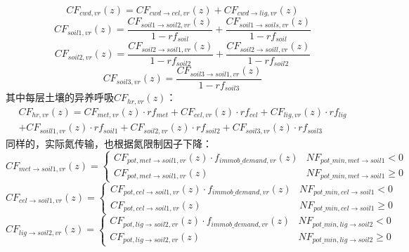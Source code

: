 \begin{equation}
C F_{c w d, vr}(z)=C F_{c w d \rightarrow cel, vr}(z)+C F_{c w d \rightarrow lig, vr}(z)
\end{equation}
\begin{equation}
C F_{{soil } 1, vr}(z)=\frac{C F_{{soil1 } \rightarrow { soil } 2, vr}(z)}{1-r f_{{soil }}}+\frac{C F_{{soil } 1 \rightarrow { soils,vr }}(z)}{1-r f_{{soil }}}
\end{equation}
\begin{equation}
C F_{{soil2,vr }}(z)=\frac{C F_{{soil2 } \rightarrow { soil1,vr }}(z)}{1-r f_{{soil2 }}}+\frac{C F_{{soil2 } \rightarrow { soill,vr }}(z)}{1-r f_{{soil2 }}}
\end{equation}
\begin{equation}
C F_{{soil3,vr }}(z)=\frac{C F_{{soil } 3 \rightarrow { soil1,vr}}(z)}{1-r f_{{soil3 }}}
\end{equation}
其中每层土壤的异养呼吸$CF_{hr,vr}\left(z\right)$：
\begin{equation}
\begin{array}{l}C F_{h r, vr}(z)=C F_{met, vr}(z) \cdot r f_{met}+C F_{cel, vr}(z) \cdot r f_{cel}+C F_{lig, vr}(z) \cdot r f_{lig} \\ +C F_{{soill } 1, vr}(z) \cdot r f_{{soil1 }}+C F_{{soil2,vr }}(z) \cdot r f_{{soil2 }}+C F_{{soil3,vr }}(z) \cdot r f_{{soil3 }}\end{array}
\end{equation}
同样的，实际氮传输，也根据氮限制因子下降：
\begin{equation}
    CF_{met \rightarrow soil1, vr}(z)=\left\{\begin{array}{ll} CF_{pot, met \rightarrow soil1, vr}(z) \cdot f_{immob\_demand, vr}(z) & NF_{pot\_{min, met \rightarrow soil1}} <0 \\ 
    CF_{pot, met \rightarrow soil1, vr}(z) & NF_{pot\_{min, met \rightarrow soil1}} \geq 0
   \end{array}\right.
\end{equation}
\begin{equation}
    CF_{cel \rightarrow soil1, vr}(z)=\left\{\begin{array}{ll} CF_{pot, cel \rightarrow soil1, vr}(z) \cdot f_{immob\_demand, vr}(z) & NF_{pot\_{min, cel \rightarrow soil1}} <0 \\ 
    CF_{pot, cel \rightarrow soil1, vr}(z) & NF_{pot\_{min, cel \rightarrow soil1}} \geq 0
   \end{array}\right.
\end{equation}
\begin{equation}
    CF_{lig \rightarrow soil2, vr}(z)=\left\{\begin{array}{ll} CF_{pot, lig \rightarrow soil2, vr}(z) \cdot f_{immob\_demand, vr}(z) & NF_{pot\_{min, lig \rightarrow soil2}} <0 \\ 
    CF_{pot, lig \rightarrow soil2, vr}(z) & NF_{pot\_{min, lig \rightarrow soil2}} \geq 0
   \end{array}\right.
\end{equation}
